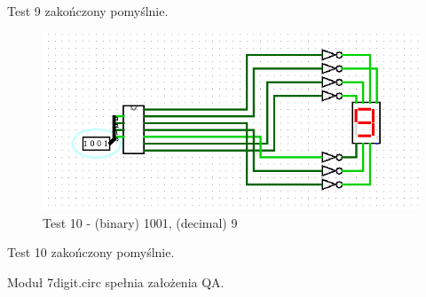 Test 9 zakończony pomyślnie.

\begin{figure}[H]
    \includegraphics[width=\linewidth]{ScreenshotsTests/Comp 1/Comp 1_00000.png}
    \caption{Test 10 - (binary) 1001, (decimal) 9}
    \label{fig:test9}
\end{figure}

Test 10 zakończony pomyślnie.

\vspace{1em}

Moduł 7digit.circ spełnia założenia QA.